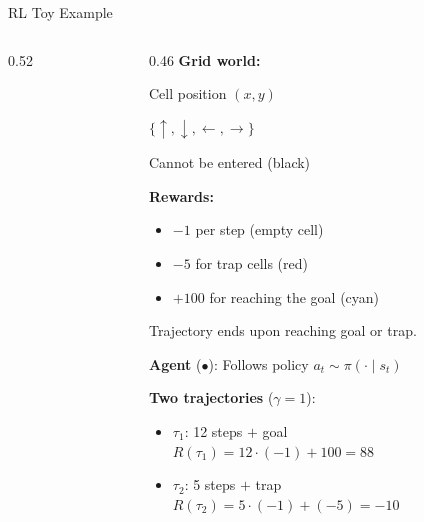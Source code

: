 \begin{frame}{RL Toy Example}
  \begin{columns}
    \begin{column}{0.52\textwidth}
      \begin{center}
      \end{center}
    \end{column}
    \begin{column}{0.46\textwidth}
      \textbf{Grid world:}
      \begin{description}[nosep]
        \item[State:] Cell position $(x, y)$
        \item[Actions:] $\{\uparrow, \downarrow, \leftarrow, \rightarrow\}$
        \item[Obstacles:] Cannot be entered (black)
      \end{description}

      \vspace{0.4em}
      \textbf{Rewards:}
      \begin{itemize}[nosep]
        \item $-1$ per step (empty cell)
        \item $-5$ for trap cells {\color{red!70!black}(red)}
        \item $+100$ for reaching the goal {\color{cyan!50!black}(cyan)}
      \end{itemize}
      Trajectory ends upon reaching goal or trap.

      \vspace{0.4em}
      \textbf{Agent} {\color{red!70!black}($\bullet$)}: Follows policy $a_t \sim \pi(\cdot \mid s_t)$

      \vspace{0.3em}
      \textbf{Two trajectories} ($\gamma = 1$):
      \begin{itemize}[nosep]
        \item {\color{green!50!black}$\tau_1$}: 12 steps $+$ goal\\
          $R(\tau_1) = 12 \cdot ({-}1) + 100 = 88$
        \item {\color{red!60}$\tau_2$}: 5 steps $+$ trap\\
          $R(\tau_2) = 5 \cdot ({-}1) + ({-}5) = {-}10$
      \end{itemize}
    \end{column}
  \end{columns}
\end{frame}

